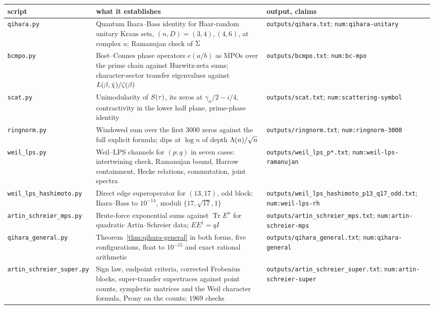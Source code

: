 \begin{center}\small
\begin{tabular}{p{4.2cm}p{6.4cm}p{4.6cm}}
\toprule
script & what it establishes & output, claims \\
\midrule
\texttt{qihara.py} & Quantum Ihara--Bass identity for Haar-random unitary Kraus sets, $(n,D) = (3,4),(4,6)$, at complex $u$; Ramanujan check of $\Sigma$ & \texttt{outputs/qihara.txt}; \texttt{num:qihara-unitary} \\
\texttt{bcmpo.py} & Bost--Connes phase operators $e(a/b)$ as MPOs over the prime chain against Hurwitz-zeta sums; character-sector transfer eigenvalues against $L(\beta,\bar\chi)/\zeta(\beta)$ & \texttt{outputs/bcmpo.txt}; \texttt{num:bc-mpo} \\
\texttt{scat.py} & Unimodularity of $S(\tau)$, its zeros at $\gamma_n/2 - i/4$, contractivity in the lower half plane, prime-phase identity & \texttt{outputs/scat.txt}; \texttt{num:scattering-symbol} \\
\texttt{ringnorm.py} & Windowed sum over the first $3000$ zeros against the full explicit formula; dips at $\log n$ of depth $\Lambda(n)/\sqrt n$ & \texttt{outputs/ringnorm.txt}; \texttt{num:ringnorm-3000} \\
\texttt{weil\_lps.py} & Weil--LPS channels for $(p;q)$ in seven cases: intertwining check, Ramanujan bound, Harrow containment, Hecke relations, commutation, joint spectra & \texttt{outputs/weil\_lps\_p*.txt}; \texttt{num:weil-lps-ramanujan} \\
\texttt{weil\_lps\_hashimoto.py} & Direct edge superoperator for $(13,17)$, odd block: Ihara--Bass to $10^{-14}$, moduli $\{17,\sqrt{17},1\}$ & \texttt{outputs/weil\_lps\_hashimoto\_p13\_q17\_odd.txt}; \texttt{num:weil-lps-rh} \\
\texttt{artin\_schreier\_mps.py} & Brute-force exponential sums against $\operatorname{Tr}E^n$ for quadratic Artin--Schreier data; $EE^\dagger = qI$ & \texttt{outputs/artin\_schreier\_mps.txt}; \texttt{num:artin-schreier-mps} \\
\texttt{qihara\_general.py} & Theorem~\ref{thm:qihara-general} in both forms, five configurations, float to $10^{-15}$ and exact rational arithmetic & \texttt{outputs/qihara\_general.txt}; \texttt{num:qihara-general} \\
\texttt{artin\_schreier\_super.py} & Sign law, endpoint criteria, corrected Frobenius blocks, super-transfer supertraces against point counts, symplectic matrices and the Weil character formula, Prony on the counts; $1969$ checks & \texttt{outputs/artin\_schreier\_super.txt}; \texttt{num:artin-schreier-super} \\

\end{tabular}
\end{center}
